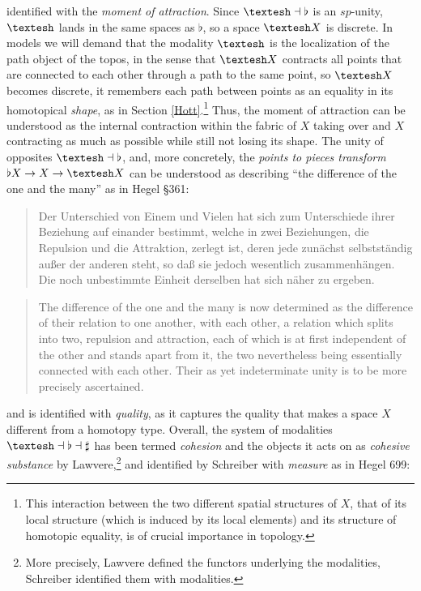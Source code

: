 \documentclass{article}
\begin{document}
identified with the \emph{moment of attraction}. Since $\textrm{\textesh}\dashv\flat$ is an $sp$-unity, 
$\textrm{\textesh}$ lands in the same spaces as $\flat$, so a space $\textrm{\textesh} X$ is discrete. In 
models we will demand that the modality 
$\textrm{\textesh}$ is the localization of the path object of the topos, in the sense that $\textrm{\textesh} X$ contracts all points that are connected to each other through a path to the same point, so $\textrm{\textesh}X$ becomes discrete, it remembers each path between points as an equality in its homotopical \emph{shape}, as in Section
\ref{Hott}.\footnote{This interaction between the two different spatial structures of $X$,
that of its local structure (which is induced by its local elements) and its structure of homotopic equality,
is of crucial importance in topology.} Thus, the moment of attraction can be understood as the internal
contraction within the fabric of $X$ taking over and $X$ contracting as much as possible while still not
losing its shape. The unity of opposites $\textrm{\textesh}\dashv\flat$, and, more concretely, the
\emph{points to pieces transform} $\flat X\rightarrow X\rightarrow \textrm{\textesh} X$ can be understood as
describing ``the difference of the one and the many'' as in Hegel §361:

\begin{quote}
    Der Unterschied von Einem und Vielen hat sich zum Unterschiede ihrer Beziehung auf einander bestimmt, welche in zwei Beziehungen, die Repulsion und die Attraktion, zerlegt ist, deren jede zunächst selbstständig außer der anderen steht, so daß sie jedoch wesentlich zusammenhängen. Die noch unbestimmte Einheit derselben hat sich näher zu ergeben.
\end{quote}
    
\begin{quote}
    The difference of the one and the many is now determined as the difference of their relation to one another, with each other, a relation which splits into two, repulsion and attraction, each of which is at first independent of the other and stands apart from it, the two nevertheless being essentially connected with each other. Their as yet indeterminate unity is to be more precisely ascertained.
\end{quote}

and is identified with \emph{quality}, as it captures the quality that makes a space $X$ different from a
homotopy type. Overall, the system of modalities $\textrm{\textesh}\dashv\flat\dashv\sharp$ has been termed
\emph{cohesion} and the objects it acts on as \emph{cohesive substance} by Lawvere,\cite{Coh}\footnote{More
precisely, Lawvere defined the functors underlying the modalities, Schreiber identified them with
modalities.} and identified by Schreiber with \emph{measure} as in Hegel 699:
\end{document}
